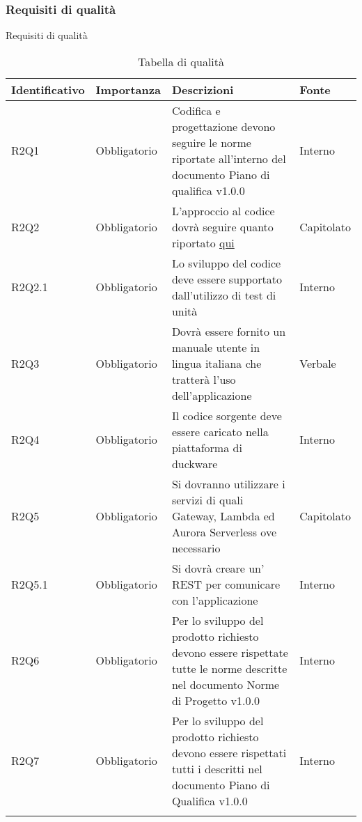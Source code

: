 \subsubsection{Requisiti di qualità}
Requisiti di qualità
\begin{center}
	\renewcommand{\arraystretch}{1.5}
	\begin{longtable}{  p{2.5cm}  p{2.1cm} p{7cm}  p{1.7cm} }
		\rowcolor{tableHeadYellow}
		\textbf{Identificativo}   & \textbf{Importanza} & \textbf{Descrizioni} & \textbf{Fonte} \\ 
		\endhead
		R2Q1   & Obbligatorio & Codifica e progettazione devono seguire le norme riportate all'interno del documento Piano di qualifica v1.0.0                      & Interno    \\  
		R2Q2   & Obbligatorio & L'approccio al codice \markg{Java} dovrà seguire quanto riportato \href{https://google.github.io/styleguide/javaguide.html}{qui}                      & Capitolato \\  
		R2Q2.1 & Obbligatorio & Lo sviluppo del codice deve essere supportato dall'utilizzo di test di unità                                                        & Interno    \\  
		R2Q3   & Obbligatorio & Dovrà essere fornito un manuale utente in lingua italiana che tratterà l'uso dell'applicazione                                      & Verbale    \\  
		R2Q4   & Obbligatorio & Il codice sorgente deve essere caricato nella piattaforma \markg{GitLab} di duckware                                                        & Interno    \\  
		R2Q5   & Obbligatorio & Si dovranno utilizzare i servizi di \markg{AWS} quali \markg{API} Gateway, Lambda ed Aurora Serverless ove necessario                               & Capitolato \\  
		R2Q5.1 & Obbligatorio & Si dovrà creare un'\markg{architettura} REST per comunicare con l'applicazione                                                              & Interno    \\  
		R2Q6   & Obbligatorio & Per lo sviluppo del prodotto richiesto devono essere rispettate tutte le norme descritte nel documento Norme di Progetto v1.0.0 & Interno    \\  
		R2Q7   & Obbligatorio & Per lo sviluppo del prodotto richiesto devono essere rispettati tutti i \markg{processi} descritti nel documento Piano di Qualifica v1.0.0 & Interno    \\
		\rowcolor{white}
		\caption{Tabella \markg{requisiti} di qualità}
	\end{longtable}
\end{center}
\clearpage
